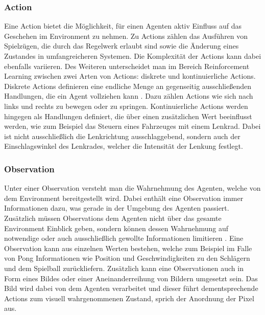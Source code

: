 \documentclass[11pt]{scrartcl}
\begin{document}
\subsubsection{Action}
\label{sec:action}
Eine Action bietet die Möglichkeit, für einen Agenten aktiv Einfluss auf das Geschehen im
Environment zu nehmen. Zu Actions zählen das Ausführen von Spielzügen, die durch das
Regelwerk erlaubt sind sowie die Änderung eines Zustandes in umfangreicheren Systemen. Die
Komplexität der Actions kann dabei ebenfalls variieren. Des Weiteren unterscheidet man im Bereich
Reinforcement Learning zwischen zwei Arten von Actions: diskrete und kontinuierliche Actions.
Diskrete Actions definieren eine endliche Menge an gegenseitig ausschließenden Handlungen, die ein
Agent vollziehen kann \cite[~S.8]{L2018}. Dazu zählen Actions wie sich nach links und rechts zu
bewegen oder zu springen. Kontinuierliche Actions werden hingegen als Handlungen definiert, die
über einen zusätzlichen Wert beeinflusst werden, wie zum Beispiel das Steuern eines Fahrzeuges
mit einem Lenkrad. Dabei ist nicht ausschließlich die Lenkrichtung ausschlaggebend, sondern auch
der Einschlagswinkel des Lenkrades, welcher die Intensität der Lenkung festlegt.


\subsubsection{Observation}
Unter einer Observation versteht man die Wahrnehmung des Agenten, welche von dem Environment 
bereitgestellt wird. Dabei enthält eine Observation immer Informationen dazu, was gerade in der
Umgebung des Agenten passiert. Zusätzlich müssen Observations dem Agenten nicht über das
gesamte Environment Einblick geben, sondern können dessen Wahrnehmung auf notwendige oder auch
ausschließlich gewollte Informationen limitieren \cite[~S.8 f.]{L2018}. Eine Observation kann 
aus einzelnen Werten bestehen, welche zum Beispiel im Falle von Pong Informationen wie Position
und Geschwindigkeiten zu den Schlägern und dem Spielball zurückliefern. Zusätzlich kann eine
Observationen auch in Form eines Bildes oder einer Aneinanderreihung von Bildern umgesetzt sein.
Das Bild wird dabei von dem Agenten verarbeitet und dieser führt dementsprechende Actions zum
visuell wahrgenommenen Zustand, sprich der Anordnung der Pixel aus.
\end{document}
